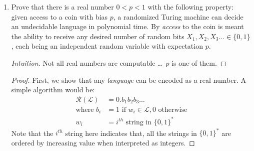 \documentclass[usletter]{article}
\newcommand {\langset}[1]      {\ensuremath{\mathcal{#1}}}
\newcommand {\machine}[1]      {\ensuremath{\mathscr{#1}}}
\newcommand {\namedlangset}[1] {\ensuremath{\textnormal{\textsc{#1}}}}
\newcommand {\family}[1]       {\ensuremath{\mathsf{#1}}}
\newcommand {\langL}          {\langset{L}}
\newcommand {\NP}     {\family{NP}}
\newcommand {\RP}     {\family{RP}}
\newcommand {\BPP}    {\family{BPP}}
\begin{document}
\begin{enumerate}[labelsep=2.5em, label=\textbf{\arabic{enumi}}]
\begin{proof}
    As \machine{R} now has a false-negative rate $\leq \frac{n}{e^{k/2}} \leq
    \frac{n}{3n} = \frac{1}{3}$; it establishes that
    $\namedlangset{SAT} \in \RP$; starting with the assumption that
    $\namedlangset{SAT} \in \BPP$. \\
    And since $\namedlangset{SAT} \in \RP$, we would have the same for any
    \NP-complete problem.
  \end{proof}
  \begin{remark}
    The above proof implies : $\NP \subseteq \RP$. But in fact $\NP = \RP$! \\
    This is because $\RP \subseteq \NP$, as discussed in class -- a problem
    being in \RP, shows that it has at least \textit{exponentially} many
    certificates; which is a subset of problems with at least \textit{one}
    certificate (\NP).
  \end{remark}


  \item Prove that there is a real number $0 < p < 1$ with the following
        property: given access to a coin with bias $p$, a randomized Turing
        machine can decide an undecidable language in polynomial time. By
        \textit{access} to the coin is meant the ability to receive any desired
        number of random bits $X_1, X_2, X_3 \ldots \in \{0,1\}$, each being an
        independent random variable with expectation $p$.
  \begin{proof}[Intuition]
    Not all real numbers are computable \ldots\ $p$ is one of them.
  \end{proof}
  \begin{proof}
    First, we show that any \textit{language} can be encoded as a real number. A
    simple algorithm would be:
    \begin{align*}
      \machine{R}(\langL) &= 0. b_1 b_2 b_3 \ldots \\
      \text{where } b_i &= 1 \text{ if } w_i \in \langL, 0 \text{ otherwise} \\
      w_i &= i^{th} \text{ string in } \{0,1\}^*
    \end{align*}
    Note that the $i^{th}$ string here indicates that, all the strings in
    $\{0,1\}^*$ are ordered by increasing value when interpreted as integers.


\end{proof}
\end{enumerate}
\end{document}
